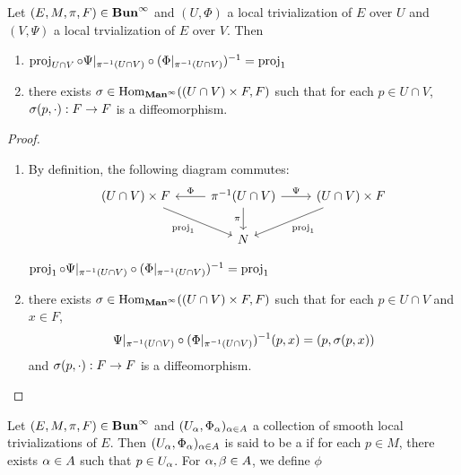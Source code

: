 \documentclass{book}
\begin{document}
	\begin{ex}
		Let $(E, M, \pi, F) \in \operatorname*{\text{\textbf{Bun}}^{\infty}}$ and $(U, \Phi)$ a local trivialization of $E$ over $U$ and $(V, \Psi)$ a local trvialization of $E$ over $V$. Then 
		\begin{enumerate}
			\item $\operatorname{\text{proj}}_{U \cap V} \circ \Psi|_{\pi^{-1}(U \cap V)} \circ (\Phi|_{\pi^{-1}(U \cap V)})^{-1} = \operatorname{\text{proj}}_1$
			\item there exists $\sigma \in \operatorname{Hom}_{\operatorname*{\text{\textbf{Man}}^{\infty}}}(( U \cap V) \times F,  F)$ such that for each $p \in U \cap V$, $\sigma(p, \cdot): F \rightarrow F$ is a diffeomorphism.
		\end{enumerate}
	\end{ex}

	\begin{proof}\
		\begin{enumerate}
			\item By definition, the following diagram commutes:
			\[ 
			\begin{tikzcd}
				(U \cap V) \times F  \arrow[dr, "\prj_{1}"'] & \pi^{-1}(U \cap V) \arrow[d, "{\pi}"'] \arrow[l, "{\Phi}"'] \arrow[r, "\Psi"] & (U \cap V) \times F \arrow[dl, "{\prj_1}"]  \\
													                & N
			\end{tikzcd}
			\] 
			
			$\operatorname{\text{proj}}_1 \circ \Psi|_{\pi^{-1}(U \cap V)} \circ (\Phi|_{\pi^{-1}(U \cap V)})^{-1} = \operatorname{\text{proj}}_1$
			\item there exists $\sigma \in \operatorname{Hom}_{\operatorname*{\text{\textbf{Man}}^{\infty}}}(( U \cap V) \times F,  F)$ such that for each $p \in U \cap V$ and $x \in F$, 
			$$\Psi|_{\pi^{-1}(U \cap V)} \circ (\Phi|_{\pi^{-1}(U \cap V)})^{-1}(p, x) = (p, \sigma(p, x))$$ 
			and $\sigma(p, \cdot): F \rightarrow F$ is a diffeomorphism.
		\end{enumerate}
	\end{proof}


	\begin{defn}
		Let $(E, M, \pi, F) \in \operatorname*{\text{\textbf{Bun}}^{\infty}}$ and $(U_{\alpha}, \Phi_{\alpha})_{\alpha \in A}$ a collection of smooth local trivializations of $E$. Then $(U_{\alpha}, \Phi_{\alpha})_{\alpha \in A}$ is said to be a  if for each $p \in M$, there exists $\alpha \in A$ such that $p \in U_{\alpha}$. For $\alpha, \beta \in A$, we define $\phi_{}$
	\end{defn}

	
	
	
	
	
	
	
	
\end{document}
